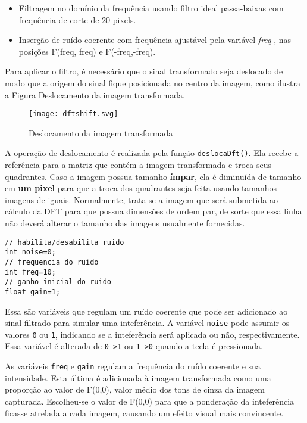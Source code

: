 \documentclass[11pt]{amsbook}
\begin{document}
\begin{itemize}

\item Filtragem no domínio da frequência usando filtro ideal passa-baixas
com frequência de corte de 20 pixels.

\item Inserção de ruído coerente com frequência ajustável pela variável
\emph{freq} , nas posições F(freq, freq) e F(-freq,-freq).

\end{itemize}


Para aplicar o filtro, é necessário que o sinal transformado seja
deslocado de modo que a origem do sinal fique posicionada no centro da
imagem, como ilustra a Figura \hyperlink{fig-dftshift}{Deslocamento da imagem transformada}.


\begin{figure}[h]{}
\centering\texttt{[image: dftshift.svg]}
\caption{Deslocamento da imagem transformada}

\end{figure}

A operação de deslocamento é realizada pela função \texttt{deslocaDft()}. Ela
recebe a referência para a matriz que contém a imagem transformada e
troca seus quadrantes. Caso a imagem possua tamanho \textbf{ímpar}, ela é
diminuída de tamanho em \textbf{um pixel} para que a troca dos quadrantes
seja feita usando tamanhos imagens de iguais. Normalmente, trata-se a
imagem que será submetida ao cálculo da DFT para que possua dimensões
de ordem par, de sorte que essa linha não deverá alterar o tamanho das
imagens usualmente fornecidas.


\begin{verbatim}
// habilita/desabilita ruido
int noise=0;
// frequencia do ruido
int freq=10;
// ganho inicial do ruido
float gain=1;
\end{verbatim}

Essa são variáveis que regulam um ruído coerente que pode ser
adicionado ao sinal filtrado para simular uma inteferência. A variável
\texttt{noise} pode assumir os valores \texttt{0} ou \texttt{1}, indicando se a
inteferência será aplicada ou não, respectivamente. Essa variável é
alterada de \texttt{0->1} ou \texttt{1->0} quando a tecla  é pressionada.


As variáveis \texttt{freq} e \texttt{gain} regulam a frequência do ruído coerente e
sua intensidade. Esta última é adicionada à imagem transformada como
uma proporção ao valor de F(0,0), valor médio dos tons de cinza
da imagem capturada. Escolheu-se o valor de F(0,0) para que a
ponderação da inteferência ficasse atrelada a cada imagem, causando um
efeito visual mais convincente.
\end{document}
